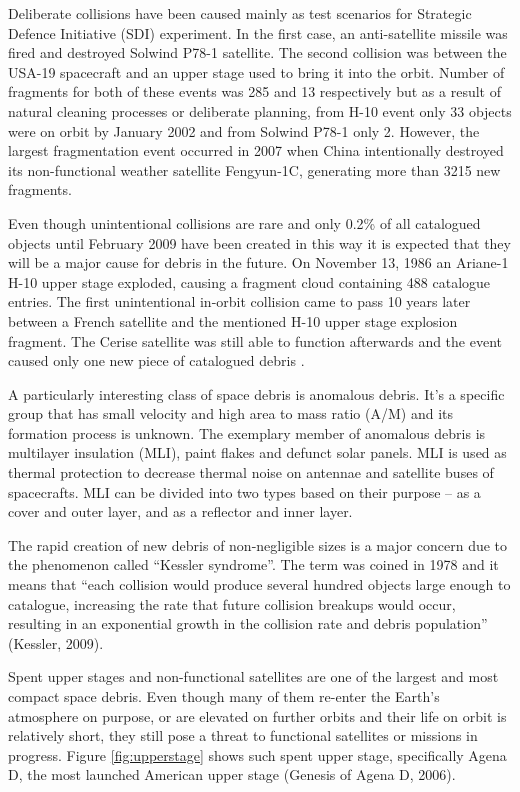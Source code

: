	Deliberate collisions have been caused mainly as test scenarios for Strategic Defence Initiative (SDI) experiment. In the first case, an anti-satellite missile was fired and destroyed Solwind P78-1 satellite. The second collision was between the USA-19 spacecraft and an upper stage used to bring it into the orbit. Number of fragments for both of these events was 285 and 13 respectively but as a result of natural cleaning processes or deliberate planning, from H-10 event only 33 objects were on orbit by January 2002 and from Solwind P78-1 only 2. However, the largest fragmentation event occurred in 2007 when China intentionally destroyed its non-functional weather satellite Fengyun-1C, generating more than 3215 new fragments. 
	
	Even though unintentional collisions are rare and only 0.2\% of all catalogued objects until February 2009 have been created in this way it is expected that they will be a major cause for debris in the future. On November 13, 1986 an Ariane-1 H-10 upper stage exploded, causing a fragment cloud containing 488 catalogue entries. The first unintentional in-orbit collision came to pass 10 years later between a French satellite and the mentioned H-10 upper stage explosion fragment. The Cerise satellite was still able to function afterwards and the event caused only one new piece of catalogued debris \citep{Silha2012id}. 
	
	A particularly interesting class of space debris is anomalous debris. It’s a specific group that has small velocity and high area to mass ratio (A/M) and its formation process is unknown. The exemplary member of anomalous debris is multilayer insulation (MLI),  paint flakes and defunct solar panels. MLI is used as thermal protection to decrease thermal noise on antennae and satellite buses of spacecrafts. MLI can be divided into two types based on their purpose – as a cover and outer layer, and as a reflector and inner layer.
	
	The rapid creation of new debris of non-negligible sizes is a major concern due to the phenomenon called “Kessler syndrome”. The term was coined in 1978 and it means that “each collision would produce several hundred objects large enough to catalogue, increasing the rate that future collision breakups would occur, resulting in an exponential growth in the collision rate and debris population” (Kessler, 2009). 
	
	Spent upper stages and non-functional satellites are one of the largest and most compact space debris. Even though many of them re-enter the Earth's atmosphere on purpose, or are elevated on further orbits and their life on orbit is relatively short, they still pose a threat to functional satellites or missions in progress. Figure \ref{fig:upperstage} shows such spent upper stage, specifically Agena D, the most launched American upper stage (Genesis of Agena D, 2006).
	
